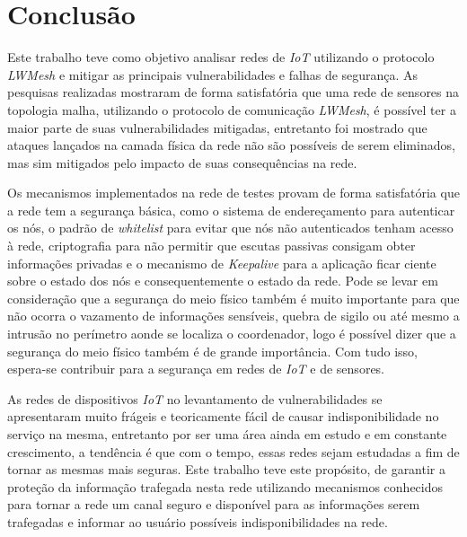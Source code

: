     \newpage
\chapter{Conclus\~ao}
Este trabalho teve como objetivo analisar redes de \emph{IoT} utilizando o protocolo \emph{LWMesh} e mitigar as principais vulnerabilidades e falhas de segurança. As pesquisas realizadas mostraram de forma satisfat\'oria que uma rede de sensores na topologia malha, utilizando o protocolo de comunica\c{c}\~ao \emph{LWMesh}, \'e poss\'ivel ter a maior parte de suas vulnerabilidades mitigadas, entretanto foi mostrado que ataques lan\c{c}ados na camada f\'isica da rede n\~ao s\~ao poss\'iveis de serem eliminados, mas sim mitigados pelo impacto de suas consequ\^encias na rede.

\par Os mecanismos implementados na rede de testes provam de forma satisfat\'oria que a rede tem a seguran\c{c}a b\'asica, como o sistema de endere\c{c}amento para autenticar os n\'os, o padr\~ao de \emph{whitelist} para evitar que n\'os n\~ao autenticados tenham acesso \`a rede, criptografia para n\~ao permitir que escutas passivas consigam obter informa\c{c}\~oes privadas e o mecanismo de \emph{Keepalive} para a aplica\c{c}\~ao ficar ciente sobre o estado dos n\'os e consequentemente o estado da rede. Pode se levar em considera\c{c}\~ao que a seguran\c{c}a do meio f\'isico tamb\'em \'e muito importante para que n\~ao ocorra o vazamento de informa\c{c}\~oes sens\'iveis, quebra de sigilo ou at\'e mesmo a intrus\~ao no per\'imetro aonde se localiza o coordenador, logo \'e poss\'ivel dizer que a seguran\c{c}a do meio f\'isico tamb\'em \'e de grande import\^ancia. Com tudo isso, espera-se contribuir para a seguran\c{c}a em redes de \emph{IoT} e de sensores.

\par As redes de dispositivos \emph{IoT} no levantamento de vulnerabilidades se apresentaram muito fr\'ageis e teoricamente f\'acil de causar indisponibilidade no servi\c{c}o na mesma, entretanto por ser uma \'area ainda em estudo e em constante crescimento, a tend\^encia \'e que com o tempo, essas redes sejam estudadas a fim de tornar as mesmas mais seguras. Este trabalho teve este prop\'osito, de garantir a prote\c{c}\~ao da informa\c{c}\~ao trafegada nesta rede utilizando mecanismos conhecidos para tornar a rede um canal seguro e dispon\'ivel para as informa\c{c}\~oes serem trafegadas e informar ao usu\'ario poss\'iveis indisponibilidades na rede.


